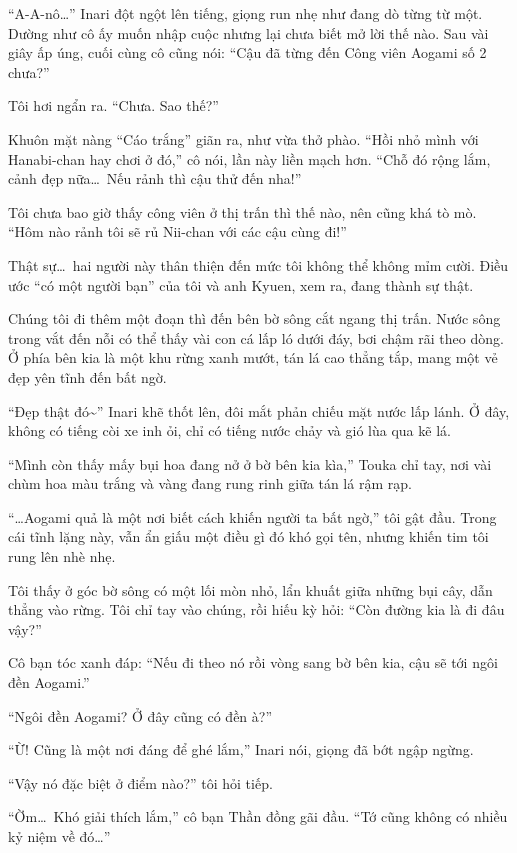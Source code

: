 \documentclass[../main.tex]{subfiles}
\begin{document}
``A-A-nô\dots'' Inari đột ngột lên tiếng, giọng run nhẹ như đang dò từng từ một. Dường như cô ấy muốn nhập cuộc nhưng lại chưa biết mở lời thế nào. Sau vài giây ấp úng, cuối cùng cô cũng nói: ``Cậu đã từng đến Công viên Aogami số 2 chưa?''

Tôi hơi ngẩn ra. ``Chưa. Sao thế?''

Khuôn mặt nàng ``Cáo trắng'' giãn ra, như vừa thở phào. ``Hồi nhỏ mình với Hanabi-chan hay chơi ở đó,'' cô nói, lần này liền mạch hơn. ``Chỗ đó rộng lắm, cảnh đẹp nữa\dots\ Nếu rảnh thì cậu thử đến nha!''

Tôi chưa bao giờ thấy công viên ở thị trấn thì thế nào, nên cũng khá tò mò. ``Hôm nào rảnh tôi sẽ rủ Nii-chan với các cậu cùng đi!''

Thật sự\dots\ hai người này thân thiện đến mức tôi không thể không mỉm cười. Điều ước ``có một người bạn'' của tôi và anh Kyuen, xem ra, đang thành sự thật.

Chúng tôi đi thêm một đoạn thì đến bên bờ sông cắt ngang thị trấn. Nước sông trong vắt đến nỗi có thể thấy vài con cá lấp ló dưới đáy, bơi chậm rãi theo dòng. Ở phía bên kia là một khu rừng xanh mướt, tán lá cao thẳng tắp, mang một vẻ đẹp yên tĩnh đến bất ngờ.


``Đẹp thật đó\~{}'' Inari khẽ thốt lên, đôi mắt phản chiếu mặt nước lấp lánh. Ở đây, không có tiếng còi xe inh ỏi, chỉ có tiếng nước chảy và gió lùa qua kẽ lá.

``Mình còn thấy mấy bụi hoa đang nở ở bờ bên kia kìa,'' Touka chỉ tay, nơi vài chùm hoa màu trắng và vàng đang rung rinh giữa tán lá rậm rạp.

``\dots Aogami quả là một nơi biết cách khiến người ta bất ngờ,'' tôi gật đầu. Trong cái tĩnh lặng này, vẫn ẩn giấu một điều gì đó khó gọi tên, nhưng khiến tim tôi rung lên nhè nhẹ.

Tôi thấy ở góc bờ sông có một lối mòn nhỏ, lẩn khuất giữa những bụi cây, dẫn thẳng vào rừng. Tôi chỉ tay vào chúng, rồi hiếu kỳ hỏi: ``Còn đường kia là đi đâu vậy?''

Cô bạn tóc xanh đáp: ``Nếu đi theo nó rồi vòng sang bờ bên kia, cậu sẽ tới ngôi đền Aogami.''

``Ngôi đền Aogami? Ở đây cũng có đền à?''

``Ừ! Cũng là một nơi đáng để ghé lắm,'' Inari nói, giọng đã bớt ngập ngừng.

``Vậy nó đặc biệt ở điểm nào?'' tôi hỏi tiếp.

``Ờm\dots\ Khó giải thích lắm,'' cô bạn Thần đồng gãi đầu. ``Tớ cũng không có nhiều kỷ niệm về đó\dots''
\end{document}
